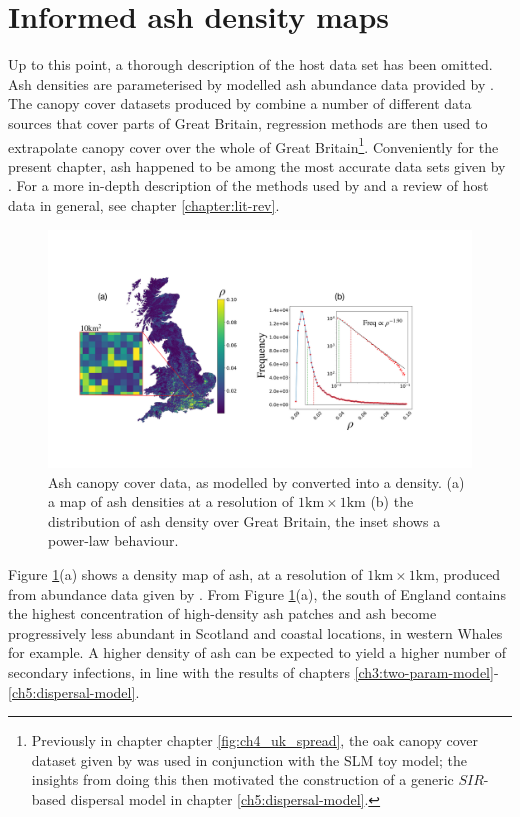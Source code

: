\section{Informed ash density maps}

Up to this point, a thorough description of the host data set has been omitted. Ash densities are parameterised by modelled ash abundance data provided by \cite{hill.data}. The canopy cover datasets produced by \cite{hill.data} combine a number of different data sources that cover parts of Great Britain, regression methods are then used to extrapolate canopy cover over the whole of Great Britain\footnote{Previously in chapter chapter \ref{fig:ch4_uk_spread}, the oak canopy cover dataset given by \cite{hill.data} was used in conjunction with the SLM toy model; the insights from doing this then motivated the construction of a generic $SIR$-based dispersal model in chapter \ref{ch5:dispersal-model}.}. Conveniently for the present chapter, ash happened to be among the most accurate data sets given by \cite{hill.data}. For a more in-depth description of the methods used by \cite{hill.data} and a review of host data in general, see chapter \ref{chapter:lit-rev}.

\begin{figure}
    \centering
    \includegraphics[scale=0.30]{chapter6/figures/fig3-ash-data.pdf}
    \caption{Ash canopy cover data, as modelled by \cite{hill.data} converted into a density. (a) a map of ash densities at a resolution of $1\mathrm{km} \times 1\mathrm{km}$ (b) the distribution of ash density over Great Britain, the inset shows a power-law behaviour.}
    \label{fig:ash-host-data}
\end{figure}

Figure \ref{fig:ash-host-data}(a) shows a density map of ash, at a resolution of $\mathrm{1km}\times \mathrm{1km}$, produced from abundance data given by \cite{hill.data}. From Figure \ref{fig:ash-host-data}(a), the south of England contains the highest concentration of high-density ash patches and ash become progressively less abundant in Scotland and coastal locations, in western Whales for example. A higher density of ash can be expected to yield a higher number of secondary infections, in line with the results of chapters \ref{ch3:two-param-model}-\ref{ch5:dispersal-model}.
 
